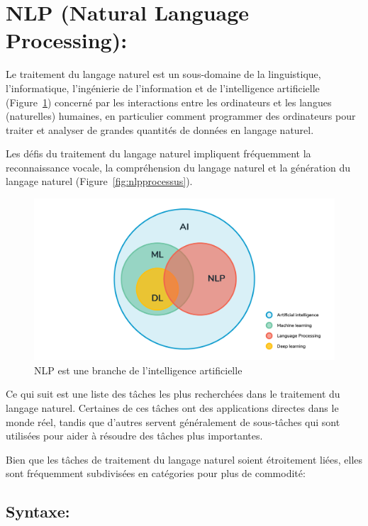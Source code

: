 \section{NLP (Natural Language Processing):}
Le traitement du langage naturel est un sous-domaine de la linguistique, l'informatique, l'ingénierie de l'information et de l'intelligence artificielle (Figure~\ref{fig:nlpinai}) concerné par les interactions entre les ordinateurs et les langues (naturelles) humaines, en particulier comment programmer des ordinateurs pour traiter et analyser de grandes quantités de données en langage naturel.

Les défis du traitement du langage naturel impliquent fréquemment la reconnaissance vocale, la compréhension du langage naturel et la génération du langage naturel (Figure~\ref{fig:nlpprocessus}).

\begin{figure}
    \centering
    \includegraphics[width=\textwidth]{etude-theorique-conception/assets/nlp.png}
    \caption{NLP est une branche de l'intelligence artificielle}
    \label{fig:nlpinai}
\end{figure}

Ce qui suit est une liste des tâches les plus recherchées dans le traitement du langage naturel. Certaines de ces tâches ont des applications directes dans le monde réel, tandis que d'autres servent généralement de sous-tâches qui sont utilisées pour aider à résoudre des tâches plus importantes.

Bien que les tâches de traitement du langage naturel soient étroitement liées, elles sont fréquemment subdivisées en catégories pour plus de commodité:

\subsection{Syntaxe:}

